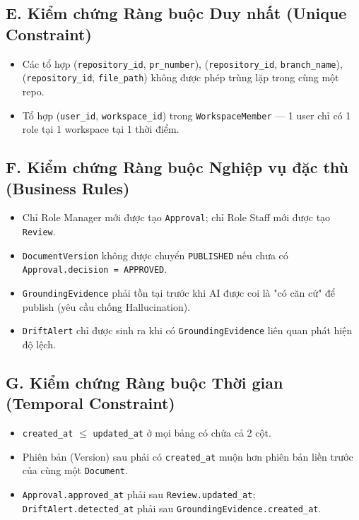 \subsection{E. Kiểm chứng Ràng buộc Duy nhất (Unique Constraint)}
\begin{itemize}
    \item Các tổ hợp (\texttt{repository\_id}, \texttt{pr\_number}), (\texttt{repository\_id}, \texttt{branch\_name}), (\texttt{repository\_id}, \texttt{file\_path}) không được phép trùng lặp trong cùng một repo.
    \item Tổ hợp (\texttt{user\_id}, \texttt{workspace\_id}) trong \texttt{WorkspaceMember} — 1 user chỉ có 1 role tại 1 workspace tại 1 thời điểm.
\end{itemize}

\subsection{F. Kiểm chứng Ràng buộc Nghiệp vụ đặc thù (Business Rules)}
\begin{itemize}
    \item Chỉ Role Manager mới được tạo \texttt{Approval}; chỉ Role Staff mới được tạo \texttt{Review}.
    \item \texttt{DocumentVersion} không được chuyển \texttt{PUBLISHED} nếu chưa có \texttt{Approval.decision = APPROVED}.
    \item \texttt{GroundingEvidence} phải tồn tại trước khi AI được coi là "có căn cứ" để publish (yêu cầu chống Hallucination).
    \item \texttt{DriftAlert} chỉ được sinh ra khi có \texttt{GroundingEvidence} liên quan phát hiện độ lệch.
\end{itemize}

\subsection{G. Kiểm chứng Ràng buộc Thời gian (Temporal Constraint)}
\begin{itemize}
    \item \texttt{created\_at} $\le$ \texttt{updated\_at} ở mọi bảng có chứa cả 2 cột.
    \item Phiên bản (Version) sau phải có \texttt{created\_at} muộn hơn phiên bản liền trước của cùng một \texttt{Document}.
    \item \texttt{Approval.approved\_at} phải sau \texttt{Review.updated\_at}; \texttt{DriftAlert.detected\_at} phải sau \texttt{GroundingEvidence.created\_at}.
\end{itemize}



